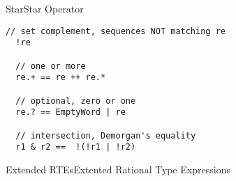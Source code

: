 \begin{frame}{Star}{Star Operator}
  \usebox\starbox
\end{frame}


\newsavebox\extendedbox
\begin{lrbox}{\extendedbox}
  \begin{minipage}{12cm}
\begin{lstlisting}[style=scalaioScala]
  // set complement, sequences NOT matching re
  !re 

  // one or more
  re.+ == re ++ re.*

  // optional, zero or one
  re.? == EmptyWord | re

  // intersection, Demorgan's equality
  r1 & r2 ==  !(!r1 | !r2)
\end{lstlisting}
  \end{minipage}
\end{lrbox}

\begin{frame}{Extended RTEs}{Extented Rational Type Expressions}
  \usebox\extendedbox
\end{frame}
